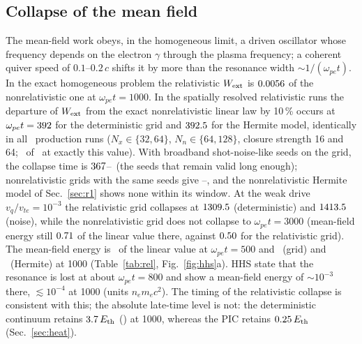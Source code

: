 \documentclass[aps,pre,reprint,floatfix,amsmath,amssymb,nofootinbib,superscriptaddress]{revtex4-2}
\newcommand{\vq}{v_q/v_{te}}
\newcommand{\wpe}{\omega_{pe}}
\newcommand{\Wext}{W_{\rm ext}}
\begin{document}
\subsection{Collapse of the mean field}
The mean-field work obeys, in the homogeneous limit, a driven oscillator whose frequency depends on the electron $\gamma$ through the plasma frequency; a coherent quiver speed of $0.1$--$0.2\,c$ shifts it by more than the resonance width $\sim1/(\wpe t)$. In the exact homogeneous problem the relativistic $\Wext$ is $0.0056$ of the nonrelativistic one at $\wpe t=1000$. In the spatially resolved relativistic runs the departure of $\Wext$ from the exact nonrelativistic linear law by 10\,\% occurs at $\wpe t=\relColGrid$ for the deterministic grid and $392.5$ for the Hermite model, identically in all \herNruns\ production runs ($N_x\in\{32,64\}$, $N_n\in\{64,128\}$, closure strength 16 and 64; \herColSame\ of \herNruns\ at exactly this value). With broadband shot-noise-like seeds on the grid, the collapse time is $367$--\relColShotHi\ (the seeds that remain valid long enough); nonrelativistic grids with the same seeds give \nrColLo--\nrColHi, and the nonrelativistic Hermite model of Sec.~\ref{sec:r1} shows none within its window. At the weak drive $v_q/v_{te}=10^{-3}$ the relativistic grid collapses at $1309.5$ (deterministic) and $1413.5$ (noise), while the nonrelativistic grid does not collapse to $\wpe t=3000$ (mean-field energy still $0.71$ of the linear value there, against $0.50$ for the relativistic grid). The mean-field energy is \relFldGridFive\ of the linear value at $\wpe t=500$ and \relFldGrid\ (grid) and \herFld\ (Hermite) at 1000 (Table~\ref{tab:rel}, Fig.~\ref{fig:hhs}a). HHS state that the resonance is lost at about $\wpe t=800$ and show a mean-field energy of $\sim10^{-3}$ there, $\lesssim10^{-4}$ at 1000 (units $n_em_ec^2$). The timing of the relativistic collapse is consistent with this; the absolute late-time level is not: the deterministic continuum retains $3.7\,E_{\rm th}$ (\relFldAbsN) at 1000, whereas the PIC retains $0.25\,E_{\rm th}$ (Sec.~\ref{sec:heat}).

\begin{table}[t]
\caption{Resonant drive $\vq=0.03$: collapse time of $\Wext$ (10\,\% departure from the nonrelativistic linear law), mean-field energy over its linear value, and $k\neq0$ electron heating (trailing $200\,\wpe^{-1}$ average, units of $E_{\rm th}=5\times10^{-4}\,n_em_ec^2$) at $\wpe t=1000$, with the time to which the model is valid (positivity $f_e>-10^{-3}$, ledger and refinement checks). $^\dagger$Shot-noise seeds: the numbers are at 1000 but the runs lose positivity earlier, so they are not results; ranges are over particle numbers $2\times10^4$--$2\times10^5$ per cell and $N_x=32$--128 (grid). PIC: seed mean at $N_{\rm ppc}=412$ (5 seeds rel., 2 Newtonian); the PIC collapse is the range over seeds. HHS: values read from their Fig.~2 and SM.}\label{tab:rel}
\small
\tabRel
\end{table}
\end{document}
